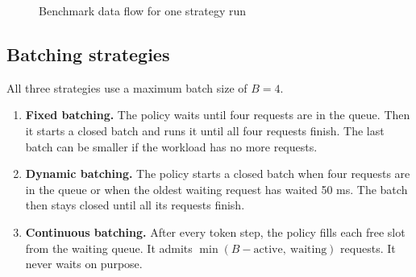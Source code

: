\documentclass[12pt,a4paper]{article}
\begin{document}
\begin{figure}[H]
\centering
{}
\caption{Benchmark data flow for one strategy run}
\label{fig:arch}
\end{figure}

\subsection{Batching strategies}
All three strategies use a maximum batch size of $B = 4$.

\begin{enumerate}
    \item \textbf{Fixed batching.} The policy waits until four requests are in the queue. Then it starts a closed batch and runs it until all four requests finish. The last batch can be smaller if the workload has no more requests.
    \item \textbf{Dynamic batching.} The policy starts a closed batch when four requests are in the queue or when the oldest waiting request has waited 50 ms. The batch then stays closed until all its requests finish.
    \item \textbf{Continuous batching.} After every token step, the policy fills each free slot from the waiting queue. It admits $\min(B - \text{active},\ \text{waiting})$ requests. It never waits on purpose.
\end{enumerate}
\end{document}
